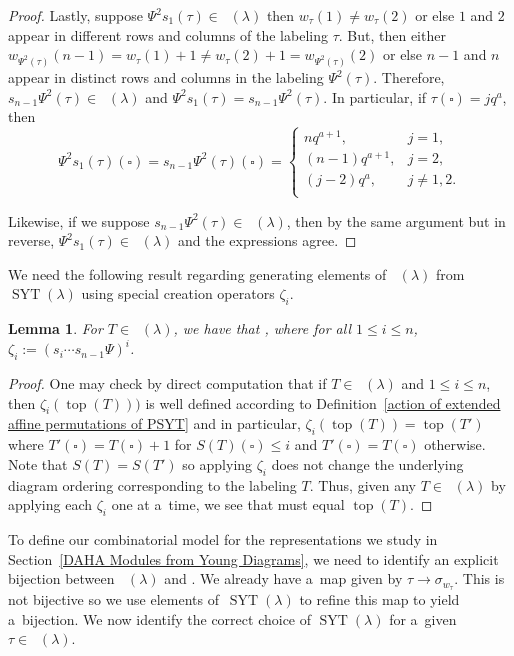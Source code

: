 \documentclass[pdftex]{sigma}
\numberwithin{equation}{section}
\newtheorem{Lemma}[Theorem]{Lemma}
\theoremstyle{definition}
\DeclareMathOperator{\RYT}{\mathrm{RYT}_{\geq 0}}
\DeclareMathOperator{\SYT}{\mathrm{SYT}}
\DeclareMathOperator{\PSYT}{\mathrm{PSYT}_{\geq 0}}
\DeclareMathOperator{\Top}{\mathrm{top}}
\begin{document}
\begin{proof}
Lastly, suppose $\Psi^{2}s_1(\tau) \in \PSYT(\lambda)$ then $w_{\tau}(1) \neq w_{\tau}(2)$ or else $1$ and $2$ appear in different rows and columns of the labeling $\tau$. But, then either $w_{\Psi^2(\tau)}(n-1) = w_{\tau}(1)+1 \neq w_{\tau}(2) +1= w_{\Psi^2(\tau)}(2)$ or else $n-1$ and $n$ appear in distinct rows and columns in the labeling $\Psi^2(\tau)$. Therefore, $s_{n-1}\Psi^2(\tau) \in \PSYT(\lambda)$ and $\Psi^{2}s_1(\tau)=s_{n-1}\Psi^2(\tau)$. In particular, if $\tau(\square) = jq^a$, then
\[
 \Psi^{2}s_1(\tau)(\square) = s_{n-1}\Psi^2(\tau)(\square) = \begin{cases}
 nq^{a+1}, & j =1 ,\\
 (n-1)q^{a+1} ,& j =2 ,\\
 (j-2)q^a ,& j\neq 1,2 .\\
\end{cases}
\]

Likewise, if we suppose $s_{n-1}\Psi^2(\tau) \in \PSYT(\lambda)$, then by the same argument but in reverse, $\Psi^{2}s_1(\tau) \in \PSYT(\lambda)$ and the expressions agree.
\end{proof}

We need the following result regarding generating elements of $\PSYT(\lambda)$ from $\SYT(\lambda)$ using special creation operators $\zeta_i$.

\begin{Lemma}\label{creation operator Lemma}
 For $T \in \RYT(\lambda)$, we have that
 \smash{$\Top(T) = \zeta_1^{\nu(T)_1 - \nu(T)_2}\cdots \zeta_n^{\nu(T)_{n}}(S(T))$}, where for all $1\leq i \leq n$,
 $\zeta_i:= (s_i\cdots s_{n-1}\Psi)^{i}$.
\end{Lemma}

\begin{proof}
 One may check by direct computation that if $T \in \RYT(\lambda)$ and $1\leq i \leq n$, then $\zeta_i(\Top(T)))$ is well defined according to Definition~\ref{action of extended affine permutations of PSYT} and in particular,
 $\zeta_i(\Top(T)) = \Top(T')$ where $T'(\square) = T(\square) + 1$ for $S(T)(\square) \leq i$ and $T'(\square) = T(\square)$ otherwise. Note that $S(T)= S(T')$ so applying $\zeta_i$ does not change the underlying diagram ordering corresponding to the labeling $T$. Thus, given any $T \in \RYT(\lambda)$ by applying each $\zeta_i$ one at a~time, we see that  must equal $\Top(T)$.
\end{proof}

To define our combinatorial model for the representations we study in Section~\ref{DAHA Modules from Young Diagrams}, we need to identify an explicit bijection between $\PSYT(\lambda)$ and \smash{$\bigl(\widehat{\mathfrak{S}}_n/\mathfrak{S}_n \bigr)^{+} \times \SYT(\lambda)$}. We already have a~map \smash{$\PSYT(\lambda) \rightarrow \bigl(\widehat{\mathfrak{S}}_n/\mathfrak{S}_n \bigr)^{+}$} given by $\tau \rightarrow \sigma_{w_{\tau}}$. This is not bijective so we use elements of~$\SYT(\lambda)$ to refine this map to yield a~bijection. We now identify the correct choice of $\SYT(\lambda)$ for a~given $\tau \in \PSYT(\lambda)$.
\end{document}
